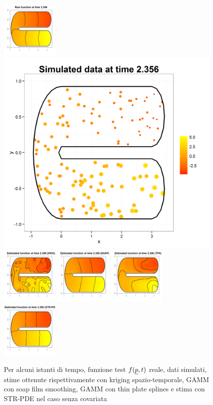 \documentclass[a4paper,11pt,twoside,openright]{book}							%
\begin{document}
\begin{landscape}
\begin{figure}
\includegraphics[width=0.25\textwidth]{immagini/simulazioni/REALEtempo4.png}
\includegraphics[height=0.25\textwidth]{immagini/simulazioni/Dati_tempo4.png}
\includegraphics[width=0.25\textwidth]{immagini/simulazioni/KRIGtempo4.png}
\includegraphics[width=0.25\textwidth]{immagini/simulazioni/SOAPtempo4.png}
\includegraphics[width=0.25\textwidth]{immagini/simulazioni/TPStempo4.png}
\includegraphics[width=0.25\textwidth]{immagini/simulazioni/STSRtempo4.png}

\caption{Per alcuni istanti di tempo, funzione test $f(\protect\underline{p},t)$ reale, dati simulati, stime ottenute rispettivamente con kriging spazio-temporale, GAMM con soap film smoothing, GAMM con thin plate splines e stima con STR-PDE nel caso senza covariata}
\label{fig:confronto_altri_metodi_nocov}
\end{figure}
\end{landscape}
\end{document}
